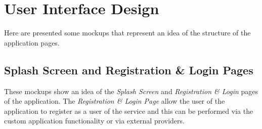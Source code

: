 \chapter{User Interface Design} \label{chap4}
Here are presented some mockups that represent an idea of the structure of the application pages.

\section{Splash Screen and Registration \& Login Pages}
These mockups show an idea of the \textit{Splash Screen} and \textit{Registration \& Login} pages of the application. The \textit{Registration \& Login Page} allow the user of the application to register as a user of the service and this can be performed via the custom application functionality or via external providers.\\

